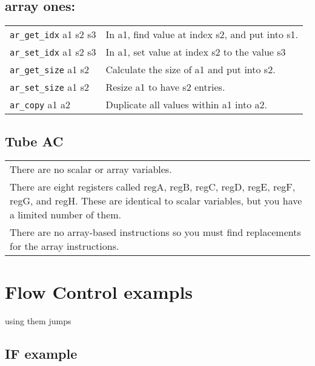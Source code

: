 \documentclass[10pt,landscape]{article}
\begin{document}
\begin{multicols}{3}
        \subsection{array ones:}
        \begin{supertabular}{p{0.1\textwidth} p{0.2\textwidth}}
        	\verb!ar_get_idx! a1 s2 s3       & In a1, find value at index s2, and put into s1. \\
        	\verb!ar_set_idx! a1 s2 s3        & In a1, set value at index s2 to the value s3\\
        	\verb!ar_get_size! a1 s2        & Calculate the size of a1 and put into s2. \\
        	\verb!ar_set_size! a1 s2       & Resize a1 to have s2 entries. \\
        	\verb!ar_copy! a1 a2       & Duplicate all values within a1 into a2.\\
        \end{supertabular}
       
        

        \subsection{Tube AC}
        \begin{itemize}
        \begin{tabular}{p{}}
        \item There are no scalar or array variables. \\
        \item There are eight registers called regA, regB, regC, regD, regE, regF, regG, and regH. These are identical to scalar variables, but you have a limited number of them.\\
        \item There are no array-based instructions so you must find replacements for the array instructions.\\   
        \end{tabular}
        \end{itemize}

		
        \section{Flow Control exampls}
        using them jumps
        
        \subsection{IF example}
        \begin{minipage}{0.1\textwidth}
        

\end{minipage}
\end{multicols}
\end{document}
